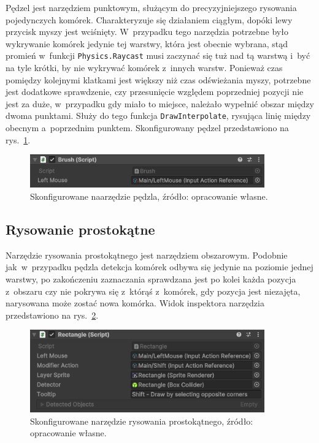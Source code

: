 Pędzel jest narzędziem punktowym, służącym do precyzyjniejszego rysowania pojedynczych komórek.
Charakteryzuje się działaniem ciągłym, dopóki lewy przycisk myszy jest wciśnięty.
W~przypadku tego narzędzia potrzebne było wykrywanie komórek jedynie tej warstwy, która jest obecnie wybrana,
stąd promień w~funkcji \texttt{Physics.Raycast} musi zaczynać się tuż nad tą warstwą
i~być na tyle krótki, by nie wykrywać komórek z~innych warstw.
Ponieważ czas pomiędzy kolejnymi klatkami jest większy niż czas odświeżania myszy,
potrzebne jest dodatkowe sprawdzenie, czy przesunięcie względem poprzedniej pozycji nie jest za duże,
w~przypadku gdy miało to miejsce, należało wypełnić obszar między dwoma punktami.
Służy do tego funkcja \texttt{DrawInterpolate},
rysująca linię między obecnym a~poprzednim punktem.
Skonfigurowany pędzel przedstawiono na rys.~\ref{fig:brush}.

\begin{figure}[h!]
    \centering
    \includegraphics[width=0.9\textwidth]{chapters/chapter4/rys/tools/brush}
    \caption[Skonfigurowane narzędzie pędzla.]{Skonfigurowane naarzędzie pędzla, źródło: opracowanie własne.}
    \label{fig:brush}
\end{figure}
%

\subsection{Rysowanie prostokątne}
\label{subsec:rysowanie_prostokatne}

Narzędzie rysowania prostokątnego jest narzędziem obszarowym.
Podobnie jak~w~przypadku pędzla detekcja komórek odbywa się jedynie na poziomie jednej warstwy,
po zakończeniu zaznaczania sprawdzana jest po kolei każda pozycja z~obszaru czy nie pokrywa się z~którąś z~komórek,
gdy pozycja jest niezajęta, narysowana może zostać nowa komórka.
Widok inspektora narzędzia przedstawiono na rys.~\ref{fig:rectangle}.

\begin{figure}[h!]
    \centering
    \includegraphics[width=0.9\textwidth]{chapters/chapter4/rys/tools/rectangle}
    \caption[Skonfigurowane narzędzie rysowania prostokątnego.]{Skonfigurowane narzędzie rysowania prostokątnego, źródło: opracowanie własne.}
    \label{fig:rectangle}
\end{figure}

